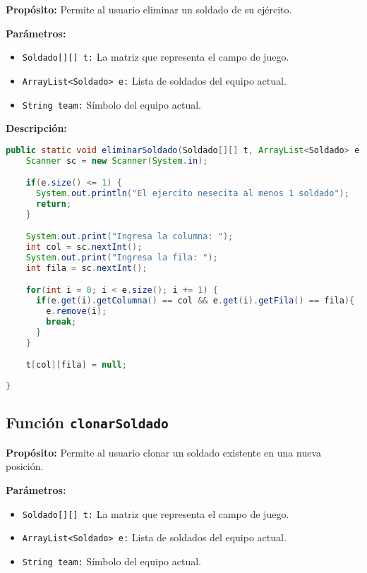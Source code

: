 \textbf{Propósito:} Permite al usuario eliminar un soldado de su ejército.

\textbf{Parámetros:}
\begin{itemize}
  \item \texttt{Soldado[][] t:} La matriz que representa el campo de juego.
  \item \texttt{ArrayList<Soldado> e:} Lista de soldados del equipo actual.
  \item \texttt{String team:} Símbolo del equipo actual.
\end{itemize}

\textbf{Descripción:}
\begin{lstlisting}[language=java]
public static void eliminarSoldado(Soldado[][] t, ArrayList<Soldado> e, String team) {
    Scanner sc = new Scanner(System.in);

    if(e.size() <= 1) {
      System.out.println("El ejercito nesecita al menos 1 soldado");
      return;
    }

    System.out.print("Ingresa la columna: ");
    int col = sc.nextInt();
    System.out.print("Ingresa la fila: ");
    int fila = sc.nextInt();

    for(int i = 0; i < e.size(); i += 1) {
      if(e.get(i).getColumna() == col && e.get(i).getFila() == fila){
        e.remove(i);
        break;
      }
    }

    t[col][fila] = null;
 
}
\end{lstlisting}

\subsection{Función \texttt{clonarSoldado}}

\textbf{Propósito:} Permite al usuario clonar un soldado existente en una nueva posición.

\textbf{Parámetros:}
\begin{itemize}
  \item \texttt{Soldado[][] t:} La matriz que representa el campo de juego.
  \item \texttt{ArrayList<Soldado> e:} Lista de soldados del equipo actual.
  \item \texttt{String team:} Símbolo del equipo actual.
\end{itemize}

